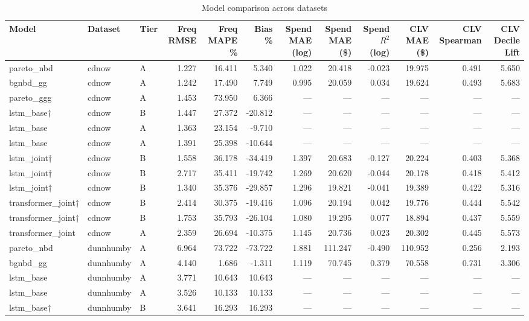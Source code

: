 \begin{table}
\caption{Model comparison across datasets}
\label{tab:model_comparison}
\begin{tabular}{lllrrrrrrrrr}
\toprule
Model & Dataset & Tier & Freq RMSE & Freq MAPE \% & Bias \% & Spend MAE (log) & Spend MAE (\$) & Spend $R^2$ (log) & CLV MAE (\$) & CLV Spearman & CLV Decile Lift \\
\midrule
pareto_nbd & cdnow & A & 1.227 & 16.411 & 5.340 & 1.022 & 20.418 & -0.023 & 19.975 & 0.491 & 5.650 \\
bgnbd_gg & cdnow & A & 1.242 & 17.490 & 7.749 & 0.995 & 20.059 & 0.034 & 19.624 & 0.493 & 5.683 \\
pareto_ggg & cdnow & A & 1.453 & 73.950 & 6.366 & — & — & — & — & — & — \\
lstm_base† & cdnow & B & 1.447 & 27.372 & -20.812 & — & — & — & — & — & — \\
lstm_base & cdnow & A & 1.363 & 23.154 & -9.710 & — & — & — & — & — & — \\
lstm_base & cdnow & A & 1.391 & 25.398 & -10.644 & — & — & — & — & — & — \\
lstm_joint† & cdnow & B & 1.558 & 36.178 & -34.419 & 1.397 & 20.683 & -0.127 & 20.224 & 0.403 & 5.368 \\
lstm_joint† & cdnow & B & 2.717 & 35.411 & -19.742 & 1.269 & 20.620 & -0.044 & 20.178 & 0.418 & 5.412 \\
lstm_joint† & cdnow & B & 1.340 & 35.376 & -29.857 & 1.296 & 19.821 & -0.041 & 19.389 & 0.422 & 5.316 \\
transformer_joint† & cdnow & B & 2.414 & 30.375 & -19.416 & 1.096 & 20.194 & 0.042 & 19.776 & 0.444 & 5.542 \\
transformer_joint† & cdnow & B & 1.753 & 35.793 & -26.104 & 1.080 & 19.295 & 0.077 & 18.894 & 0.437 & 5.559 \\
transformer_joint & cdnow & A & 2.359 & 26.694 & -10.375 & 1.145 & 20.736 & 0.023 & 20.302 & 0.445 & 5.573 \\
pareto_nbd & dunnhumby & A & 6.964 & 73.722 & -73.722 & 1.881 & 111.247 & -0.490 & 110.952 & 0.256 & 2.193 \\
bgnbd_gg & dunnhumby & A & 4.140 & 1.686 & -1.311 & 1.119 & 70.745 & 0.379 & 70.558 & 0.731 & 3.306 \\
lstm_base & dunnhumby & A & 3.771 & 10.643 & 10.643 & — & — & — & — & — & — \\
lstm_base & dunnhumby & A & 3.526 & 10.133 & 10.133 & — & — & — & — & — & — \\
lstm_base† & dunnhumby & B & 3.641 & 16.293 & 16.293 & — & — & — & — & — & — \\

\end{tabular}
\end{table}
